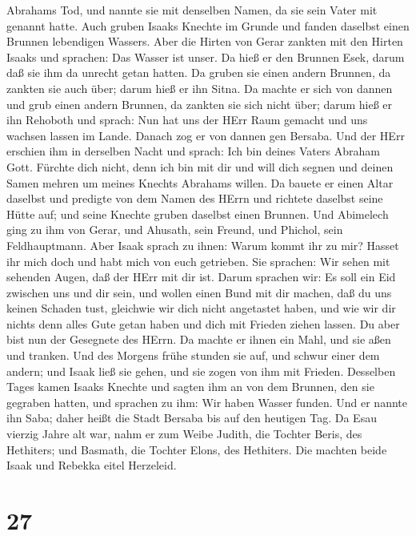 Abrahams Tod, und nannte sie mit denselben Namen, da sie sein Vater mit
genannt hatte.  Auch gruben Isaaks Knechte im Grunde und
fanden daselbst einen Brunnen lebendigen Wassers.  Aber die
Hirten von Gerar zankten mit den Hirten Isaaks und sprachen: Das Wasser
ist unser. Da hieß er den Brunnen Esek, darum daß sie ihm da unrecht
getan hatten.  Da gruben sie einen andern Brunnen, da
zankten sie auch über; darum hieß er ihn Sitna.  Da machte
er sich von dannen und grub einen andern Brunnen, da zankten sie sich
nicht über; darum hieß er ihn Rehoboth und sprach: Nun hat uns der HErr
Raum gemacht und uns wachsen lassen im Lande.  Danach zog
er von dannen gen Bersaba.  Und der HErr erschien ihm in
derselben Nacht und sprach: Ich bin deines Vaters Abraham Gott. Fürchte
dich nicht, denn ich bin mit dir und will dich segnen und deinen Samen
mehren um meines Knechts Abrahams willen.  Da bauete er
einen Altar daselbst und predigte von dem Namen des HErrn und richtete
daselbst seine Hütte auf; und seine Knechte gruben daselbst einen
Brunnen.  Und Abimelech ging zu ihm von Gerar, und Ahusath,
sein Freund, und Phichol, sein Feldhauptmann.  Aber Isaak
sprach zu ihnen: Warum kommt ihr zu mir? Hasset ihr mich doch und habt
mich von euch getrieben.  Sie sprachen: Wir sehen mit
sehenden Augen, daß der HErr mit dir ist. Darum sprachen wir: Es soll
ein Eid zwischen uns und dir sein, und wollen einen Bund mit dir machen,
 daß du uns keinen Schaden tust, gleichwie wir dich nicht
angetastet haben, und wie wir dir nichts denn alles Gute getan haben und
dich mit Frieden ziehen lassen. Du aber bist nun der Gesegnete des
HErrn.  Da machte er ihnen ein Mahl, und sie aßen und
tranken.  Und des Morgens frühe stunden sie auf, und schwur
einer dem andern; und Isaak ließ sie gehen, und sie zogen von ihm mit
Frieden.  Desselben Tages kamen Isaaks Knechte und sagten
ihm an von dem Brunnen, den sie gegraben hatten, und sprachen zu ihm:
Wir haben Wasser funden.  Und er nannte ihn Saba; daher
heißt die Stadt Bersaba bis auf den heutigen Tag.  Da Esau
vierzig Jahre alt war, nahm er zum Weibe Judith, die Tochter Beris, des
Hethiters; und Basmath, die Tochter Elons, des Hethiters. 
Die machten beide Isaak und Rebekka eitel Herzeleid.

\hypertarget{section-26}{%
\section{27}\label{section-26}}

